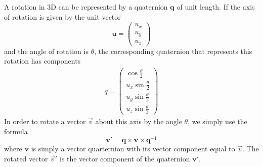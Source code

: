 A rotation in 3D can be represented by a quaternion \( \mathbf{q} \) of unit length. If the axis of rotation is given by the unit
vector
\begin{equation}
    \mathbf{u} = \begin{pmatrix}
        u_x \\ u_y \\ u_z
    \end{pmatrix}
\end{equation}
and the angle of rotation is \( \theta \), the corresponding quaternion that represents this rotation has components
\begin{align}
    q = \begin{pmatrix}
            \cos{\frac{\theta}{2}}     \\
            u_x \sin{\frac{\theta}{2}} \\
            u_y \sin{\frac{\theta}{2}} \\
            u_z \sin{\frac{\theta}{2}}
        \end{pmatrix}
\end{align}
In order to rotate a vector \( \vec{v} \) about this axis by the angle \( \theta \), we simply use the formula
\begin{equation}
    \mathbf{v}' = \mathbf{q} \times \mathbf{v} \times \mathbf{q}^{-1} \label{eq:quaternion_rotation}
\end{equation}
where \( \mathbf{v} \) is simply a vector quarternion with its vector component equal to \( \vec{v} \). The rotated vector
\( \vec{v}' \) is the vector component of the quaternion \( \mathbf{v}' \).

